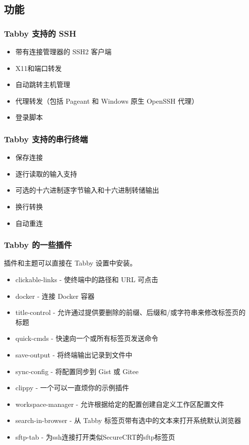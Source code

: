 \documentclass[xcolor=table,dvipsnames,svgnames,aspectratio=169]{ctexbeamer}
\begin{document}
\subsection{功能}

\begin{frame}
  \frametitle{Tabby 支持的 SSH}

  \begin{itemize}
    \item 带有连接管理器的 SSH2 客户端
    \item X11和端口转发
    \item 自动跳转主机管理
    \item 代理转发（包括 Pageant 和 Windows 原生 OpenSSH 代理）
    \item 登录脚本
  \end{itemize}

\end{frame}

\begin{frame}
  \frametitle{Tabby 支持的串行终端}

  \begin{itemize}
    \item 保存连接
    \item 逐行读取的输入支持
    \item 可选的十六进制逐字节输入和十六进制转储输出
    \item 换行转换
    \item 自动重连
  \end{itemize}

\end{frame}
\begin{frame}[allowframebreaks]
  \frametitle{Tabby 的一些插件}
  插件和主题可以直接在 Tabby 设置中安装。

  \begin{itemize}
    \item clickable-links - 使终端中的路径和 URL 可点击
    \item docker - 连接 Docker 容器
    \item title-control - 允许通过提供要删除的前缀、后缀和/或字符串来修改标签页的标题
    \item quick-cmds - 快速向一个或所有标签页发送命令
    \item save-output - 将终端输出记录到文件中
    \item sync-config - 将配置同步到 Gist 或 Gitee
    \item clippy - 一个可以一直烦你的示例插件
    \item workspace-manager - 允许根据给定的配置创建自定义工作区配置文件
    \item search-in-browser - 从 Tabby 标签页带有选中的文本来打开系统默认浏览器
    \item sftp-tab - 为ssh连接打开类似SecureCRT的sftp标签页
  \end{itemize}

\end{frame}
\end{document}
